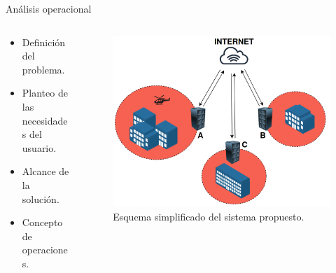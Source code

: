 \documentclass[serif, aspectratio=169]{beamer}
\begin{document}
\begin{frame}{Análisis operacional}
    \begin{columns}
        \begin{column}{0.38\textwidth}
            \begin{itemize}
            \item Definición del problema.
            \item Planteo de las necesidades del usuario.
            \item Alcance de la solución.
            \item Concepto de operaciones.
            \end{itemize}

            
        \end{column}

        \begin{column}{0.45\textwidth}
            \begin{figure}
                \centering
                \includegraphics[width=\textwidth]{images/conops.png}
                \caption{\centering Esquema simplificado del sistema propuesto.} 
            \end{figure}
        \end{column}
    \end{columns}


\end{frame}
\end{document}
